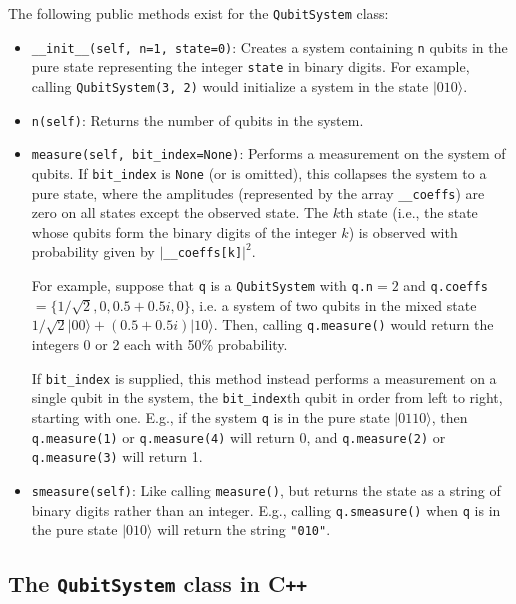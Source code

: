 \documentclass{article}
\newcommand{\cpp}{C{}\texttt{++}}
\begin{document}
The following public methods exist for the \verb~QubitSystem~ class:
\begin{itemize}
\item \verb~__init__(self, n=1, state=0)~: Creates a system containing \verb~n~ qubits in the pure state representing the integer \verb~state~ in binary digits. For example, calling \verb~QubitSystem(3, 2)~ would initialize a system in the state $|010\rangle$. 
\item \verb~n(self)~: Returns the number of qubits in the system. 
\item \verb~measure(self, bit_index=None)~: Performs a measurement on the system of qubits. If \verb~bit_index~ is \verb~None~ (or is omitted), this collapses the system to a pure state, where the amplitudes (represented by the array \verb~__coeffs~) are zero on all states except the observed state. The $k$th state (i.e., the state whose qubits form the binary digits of the integer $k$) is observed with probability given by $|$\verb~__coeffs[k]~$|^2$. 

For example, suppose that \verb~q~ is a \verb~QubitSystem~ with \verb~q.n~$ = 2$ and \verb~q.coeffs~$ = \{1/\sqrt{2}, 0, 0.5 + 0.5i, 0\}$, i.e. a system of two qubits in the mixed state $1/\sqrt{2}|00\rangle + (0.5+0.5i)|10\rangle$. Then, calling \verb~q.measure()~ would return the integers 0 or 2 each with 50\% probability. 

If \verb~bit_index~ is supplied, this method instead performs a measurement on a single qubit in the system, the \verb~bit_index~th qubit in order from left to right, starting with one. E.g., if the system \verb~q~ is in the pure state $|0110\rangle$, then \verb~q.measure(1)~ or \verb~q.measure(4)~ will return 0, and \verb~q.measure(2)~ or \verb~q.measure(3)~ will return 1. 

\item \verb~smeasure(self)~: Like calling \verb~measure()~, but returns the state as a string of binary digits rather than an integer. E.g., calling \verb~q.smeasure()~ when \verb~q~ is in the pure state $|010\rangle$ will return the string \verb~"010"~. 

\end{itemize} 



\subsection{The \texttt{QubitSystem} class in \cpp}
\end{document}

